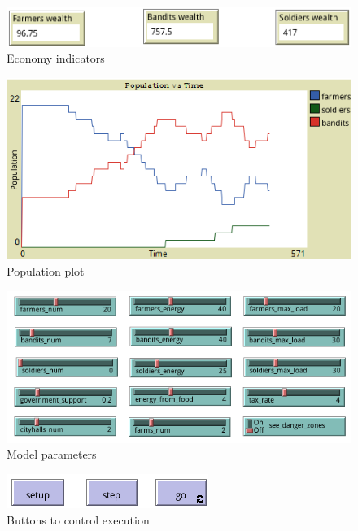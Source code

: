 \documentclass{wscpaperproc}
\begin{document}
\begin{figure}[h!]
    \centering
    \includegraphics[scale=0.5]{Images/Economy1}
    \caption{Economy indicators}
    \label{imp:economy1}
\end{figure}

\begin{figure}[h!]
    \centering
    \includegraphics[scale=0.5]{Images/Population1}
    \caption{Population plot}
    \label{imp:population_plot1}
\end{figure}

\begin{figure}[h!]
    \centering
    \includegraphics[scale=0.5]{Images/Sliders1}
    \caption{Model parameters}
    \label{imp:parameters1}
\end{figure}

\begin{figure}[h!]
    \centering
    \includegraphics[scale=0.5]{Images/Buttons}
    \caption{Buttons to control execution}
    \label{imp:buttons}
\end{figure}



\end{document}
